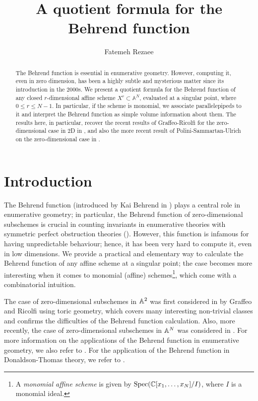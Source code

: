 \documentclass[11pt,a4paper,leqno,noamsfonts]{amsart}
\title[A quotient formula for the Behrend function]{A quotient formula for the Behrend function}
\author{Fatemeh Rezaee}
\date{}
\numberwithin{equation}{section}
\begin{document}
\maketitle

\begin{abstract}
The Behrend function is essential in enumerative geometry.  However, computing it, even in zero dimension, has been a highly subtle and mysterious matter since its introduction in the 2000s. 
We present a quotient formula for the Behrend function of any closed $r$-dimensional affine scheme $X^r \subset \mathbb{A}^N$, evaluated at a singular point, where $0\leq r \leq N-1$.
In particular, if the scheme is monomial, we associate parallelepipeds to it and interpret the Behrend function as simple volume information about them.  The results here, in particular, recover the recent results of Graffeo-Ricolfi for the zero-dimensional case in 2D in \cite{Graffeo-Ricolfi}, and also the more recent result of Polini-Sammartan-Ulrich on the zero-dimensional case in \cite{PSU26}.


\end{abstract}

{\hypersetup{linkcolor=black}
\tableofcontents}



\section{Introduction}
The Behrend function (introduced by Kai Behrend in \cite{Beh}) plays a central role in enumerative geometry; in particular, the Behrend function of zero-dimensional subschemes is crucial in counting invariants in enumerative theories with symmetric perfect obstruction theories (\cite{BFinc,BFHilb}). However, this function is infamous for having unpredictable behaviour; hence, it has been very hard to compute it, even in low dimensions. We provide a practical and elementary way to calculate the Behrend function of any affine scheme at a singular point; the case becomes more interesting when it comes to monomial (affine) schemes\footnote{A \emph{monomial affine scheme} is given by $\operatorname{Spec}({\mathbb{C}}[x_1,\ldots,x_N]/I)$, where $I$ is a monomial ideal.}, which come with a combinatorial intuition. 

The case of zero-dimensional subschemes in ${\mathbb{A}}^2$ was first considered in \cite{Graffeo-Ricolfi} by Graffeo and Ricolfi using toric geometry, which covers many interesting non-trivial classes and confirms the difficulties of the Behrend function calculation. Also, more recently, the case of zero-dimensional subschemes in ${\mathbb{A}}^N$ was  considered in \cite{PSU26}.  For more information on the applications of the Behrend function in enumerative geometry, we also refer to \cite{Graffeo-Ricolfi}. For the application of the Behrend function in Donaldson-Thomas theory, we refer to \cite{JoyceSong}.
\end{document}
